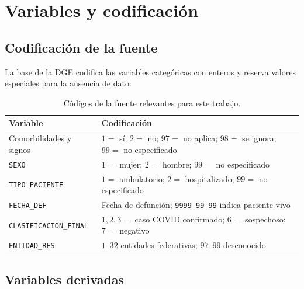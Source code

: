 \chapter{Variables y codificación}
\label{ap:variables}

\section{Codificación de la fuente}

La base de la DGE codifica las variables categóricas con enteros y reserva valores
especiales para la ausencia de dato:

\begin{table}[htbp]
\centering
\caption{Códigos de la fuente relevantes para este trabajo.}
\label{tab:codigos}
\small
\begin{tabular}{l p{10.2cm}}
\toprule
Variable & Codificación \\
\midrule
Comorbilidades y signos & $1=$ sí; $2=$ no; $97=$ no aplica; $98=$ se ignora; $99=$ no especificado \\
\texttt{SEXO} & $1=$ mujer; $2=$ hombre; $99=$ no especificado \\
\texttt{TIPO\_PACIENTE} & $1=$ ambulatorio; $2=$ hospitalizado; $99=$ no especificado \\
\texttt{FECHA\_DEF} & Fecha de defunción; \texttt{9999-99-99} indica paciente vivo \\
\texttt{CLASIFICACION\_FINAL} & $1,2,3=$ caso COVID confirmado; $6=$ sospechoso; $7=$ negativo \\
\texttt{ENTIDAD\_RES} & $1$--$32$ entidades federativas; $97$--$99$ desconocido \\
\bottomrule
\end{tabular}
\end{table}

\section{Variables derivadas}

